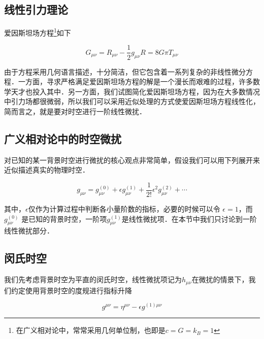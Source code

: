 
\begin{issues}
\issueMissDepend
\issueDraft
\end{issues}



\subsection{线性引力理论}
爱因斯坦场方程\footnote{在广义相对论中，常常采用几何单位制，也即是$c=G=k_B=1$}如下

\begin{equation}
G_{\mu \nu} = R_{\mu \nu} - \frac{1}{2}g_{\mu\nu}R = 8 G\pi T_{\mu\nu}
\end{equation}

由于方程采用几何语言描述，十分简洁，但它包含着一系列复杂的非线性微分方程．一方面，寻求严格满足爱因斯坦场方程的解是一个漫长而艰难的过程，许多数学天才也投入其中．另一方面，我们试图简化爱因斯坦场方程，因为在大多数情况中引力场都很微弱，所以我们可以采用近似处理的方式使爱因斯坦场方程线性化，简而言之，就是要对时空进行一阶线性微扰．


\subsection{广义相对论中的时空微扰}

对已知的某一背景时空进行微扰的核心观点非常简单，假设我们可以用下列展开来近似描述真实的物理时空．

\begin{equation}
g_{\mu\nu}=g^{(0)}_{\mu\nu} + \epsilon g^{(1)}_{\mu\nu} + \frac{1}{2!}\epsilon^2 g^{(2)}_{\mu\nu}+\cdots
\end{equation}

其中，$\epsilon $仅作为计算过程中判断各小量阶数的指标，必要的时候可以令 $\epsilon = 1 $，而$g^{(0)}_{\mu\nu} $ 是已知的背景时空，一阶项$g^{(1)}_{\mu\nu}$是线性微扰项．在本节中我们只讨论到一阶线性微扰部分．


\subsection{闵氏时空}

我们先考虑背景时空为平直的闵氏时空，线性微扰项记为$h_{\mu\nu}$在微扰的情景下，我们约定使用背景时空的度规进行指标升降

\begin{equation}
g^{\mu\nu} = \eta^{\mu\nu} - \epsilon g^{(1)\mu\nu}
\end{equation}

